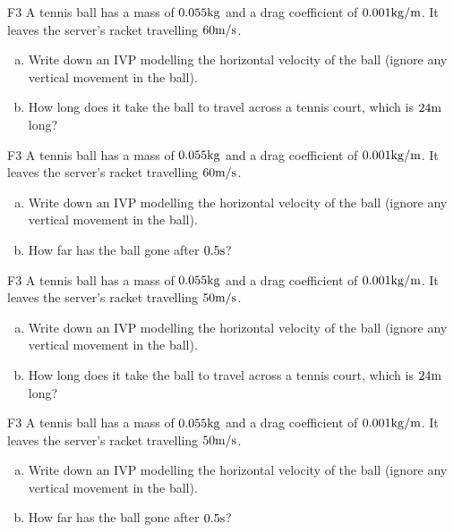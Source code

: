 \begin{problem}{F3}
A tennis ball has a mass of \(0.055 {\rm kg}\) and a drag coefficient of \(0.001 {\rm kg/m}\).  It leaves the server's racket travelling \(60 {\rm m/s}\). 
\begin{enumerate}[(a)]
\item Write down an IVP modelling the horizontal velocity of the ball (ignore any vertical movement in the ball).
\item How long does it take the ball to travel across a tennis court, which is \(24 {\rm m}\) long?
\end{enumerate}
\end{problem}

\begin{problem}{F3}
A tennis ball has a mass of \(0.055 {\rm kg}\) and a drag coefficient of \(0.001 {\rm kg/m}\).  It leaves the server's racket travelling \(60 {\rm m/s}\). 
\begin{enumerate}[(a)]
\item Write down an IVP modelling the horizontal velocity of the ball (ignore any vertical movement in the ball).
\item How far has the ball gone after \(0.5 {\rm s}\)?
\end{enumerate}
\end{problem}

\begin{problem}{F3}
A tennis ball has a mass of \(0.055 {\rm kg}\) and a drag coefficient of \(0.001 {\rm kg/m}\).  It leaves the server's racket travelling \(50 {\rm m/s}\). 
\begin{enumerate}[(a)]
\item Write down an IVP modelling the horizontal velocity of the ball (ignore any vertical movement in the ball).
\item How long does it take the ball to travel across a tennis court, which is \(24 {\rm m}\) long?
\end{enumerate}
\end{problem}

\begin{problem}{F3}
A tennis ball has a mass of \(0.055 {\rm kg}\) and a drag coefficient of \(0.001 {\rm kg/m}\).  It leaves the server's racket travelling \(50 {\rm m/s}\). 
\begin{enumerate}[(a)]
\item Write down an IVP modelling the horizontal velocity of the ball (ignore any vertical movement in the ball).
\item How far has the ball gone after \(0.5 {\rm s}\)?
\end{enumerate}
\end{problem}


